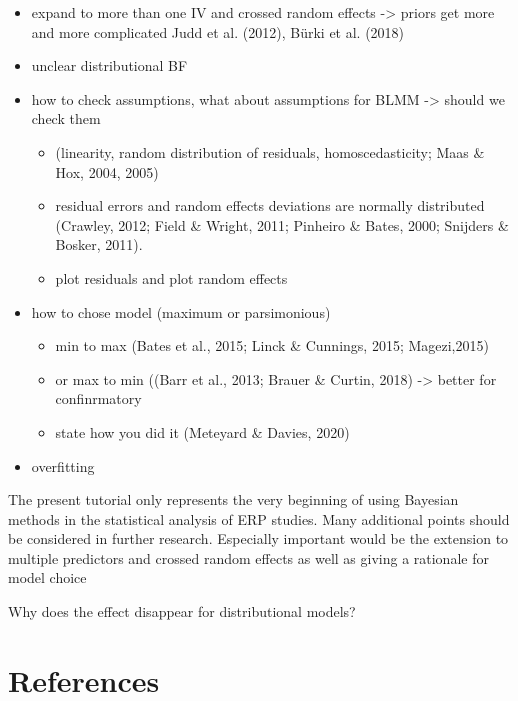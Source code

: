 \documentclass[
  doc,12pt,floatsintext]{apa7}
\providecommand{\tightlist}{%
  \setlength{\itemsep}{0pt}\setlength{\parskip}{0pt}}
\begin{document}
\begin{itemize}
\tightlist
\item
  expand to more than one IV and crossed random effects -\textgreater{} priors get more and more complicated
  Judd et al. (2012), Bürki et al. (2018)
\item
  unclear distributional BF
\item
  how to check assumptions, what about assumptions for BLMM -\textgreater{} should we check them

  \begin{itemize}
  \tightlist
  \item
    (linearity, random distribution of residuals, homoscedasticity; Maas \& Hox, 2004, 2005)
  \item
    residual errors and random effects deviations are normally distributed (Crawley, 2012; Field \& Wright, 2011; Pinheiro \& Bates, 2000; Snijders \& Bosker, 2011).
  \item
    plot residuals and plot random effects
  \end{itemize}
\item
  how to chose model (maximum or parsimonious)

  \begin{itemize}
  \tightlist
  \item
    min to max (Bates et al., 2015; Linck \& Cunnings, 2015; Magezi,2015)
  \item
    or max to min ((Barr et al., 2013; Brauer \& Curtin, 2018) -\textgreater{} better for confinrmatory
  \item
    state how you did it (Meteyard \& Davies, 2020)
  \end{itemize}
\item
  overfitting
\end{itemize}

The present tutorial only represents the very beginning of using Bayesian methods in the statistical analysis of ERP studies. Many additional points should be considered in further research. Especially important would be the extension to multiple predictors and crossed random effects as well as giving a rationale for model choice

Why does the effect disappear for distributional models?

\newpage

\section{References}\label{references}
\end{document}
